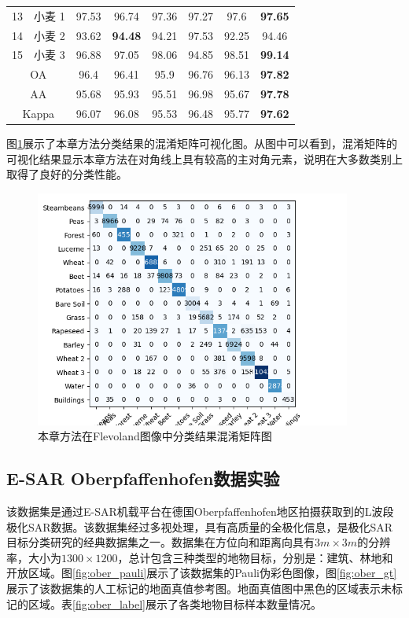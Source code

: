 \begin{table}[ht!]
\begin{tabular}{cccccccc}
    13                        & 小麦 1  & 97.53          & 96.74          & 97.36          & 97.27          & 97.6           & \textbf{97.65} \\
    14                        & 小麦 2  & 93.62          & \textbf{94.48} & 94.21          & 97.53          & 92.25          & 94.46          \\
    15                        & 小麦 3  & 96.88          & 97.05          & 98.06          & 94.85          & 98.51          & \textbf{99.14} \\
    \midrule[0.75bp]
    \multicolumn{2}{c}{OA}    & 96.4  & 96.41          & 95.9           & 96.76          & 96.13          & \textbf{97.82}                  \\
    \multicolumn{2}{c}{AA}    & 95.68 & 95.93          & 95.51          & 96.98          & 95.67          & \textbf{97.78}                  \\
    \multicolumn{2}{c}{Kappa} & 96.07 & 96.08          & 95.53          & 96.48          & 95.77          & \textbf{97.62}                  \\
    \bottomrule[1.5bp]
  \end{tabular}
\end{table}

图\ref{fig:fle_conf_matrix}展示了本章方法分类结果的混淆矩阵可视化图。从图中可以看到，混淆矩阵的可视化结果显示本章方法在对角线上具有较高的主对角元素，说明在大多数类别上取得了良好的分类性能。

\begin{figure}[h]
  \centering
  \includegraphics[width=10.4cm]{pic/chapter3/fle/conf-matrix.png}
  \caption{本章方法在Flevoland图像中分类结果混淆矩阵图}
  \label{fig:fle_conf_matrix}
\end{figure}


\subsection{E-SAR Oberpfaffenhofen数据实验}
该数据集是通过E-SAR机载平台在德国Oberpfaffenhofen地区拍摄获取到的L波段极化SAR数据。该数据集经过多视处理，具有高质量的全极化信息，是极化SAR目标分类研究的经典数据集之一。数据集在方位向和距离向具有$3m \times 3m$的分辨率，大小为$1300 \times 1200$，总计包含三种类型的地物目标，分别是：建筑、林地和开放区域。图\ref{fig:ober_pauli}展示了该数据集的Pauli伪彩色图像，图\ref{fig:ober_gt}展示了该数据集的人工标记的地面真值参考图。地面真值图中黑色的区域表示未标记的区域。表\ref{fig:ober_label}展示了各类地物目标样本数量情况。

